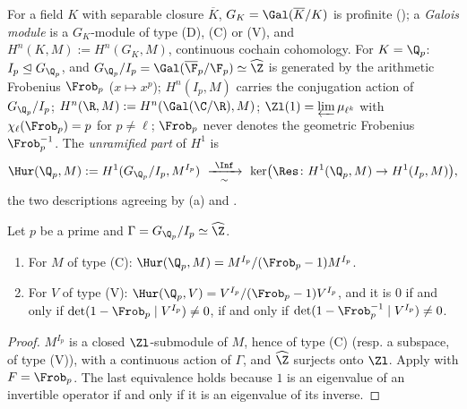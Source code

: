 \begin{convention}\label{conv:cohomology:galois}
For a field $K$ with separable closure $\overline K$, $G_K=\Gal(\overline K/K)$ is profinite (); a \emph{Galois module} is a $G_K$-module of type (D), (C) or
(V), and $H^n(K,M):=H^n(G_K,M)$, continuous cochain cohomology. For $K=\Q_p$: $I_p\trianglelefteq G_{\Q_p}$, and $G_{\Q_p}/I_p=\Gal(\overline\F_p/\F_p)\simeq\widehat\Z$ is generated by the
arithmetic Frobenius $\Frob_p$ ($x\mapsto x^p$); $H^n(I_p,M)$ carries the conjugation action of $G_{\Q_p}/I_p$; $H^n(\R,M):=H^n(\Gal(\C/\R),M)$; $\Zl(1)=\varprojlim\mu_{\ell^k}$
with $\chi_\ell(\Frob_p)=p$ for $p\ne\ell$; $\Frob_p$ never denotes the geometric Frobenius $\Frob_p^{-1}$. The \emph{unramified part} of $H^1$ is
\[
\Hur(\Q_p,M):=H^1(G_{\Q_p}/I_p,M^{I_p})\ \xrightarrow[\ \sim\ ]{\ \Inf\ }\ \ker\bigl(\Res\colon H^1(\Q_p,M)\to H^1(I_p,M)\bigr),
\]
the two descriptions agreeing by (a) and .
\end{convention}

\begin{proposition}\label{prop:cohomology:unramified}
Let $p$ be a prime and $\Gamma=G_{\Q_p}/I_p\simeq\widehat\Z$.
\begin{enumerate}[label=(\roman*)]
\item For $M$ of type (C): $\Hur(\Q_p,M)=M^{I_p}/(\Frob_p-1)M^{I_p}$.
\item For $V$ of type (V): $\Hur(\Q_p,V)=V^{I_p}/(\Frob_p-1)V^{I_p}$, and it is $0$ if and only if $\det(1-\Frob_p\mid V^{I_p})\ne0$, if and only if
$\det(1-\Frob_p^{-1}\mid V^{I_p})\ne0$.
\end{enumerate}
\end{proposition}

\begin{proof}
$M^{I_p}$ is a closed $\Zl$-submodule of $M$, hence of type (C) (resp. a subspace, of type (V)), with a continuous action of $\Gamma$, and $\widehat\Z$ surjects onto $\Zl$.
Apply  with $F=\Frob_p$. The last equivalence holds because $1$ is an eigenvalue of an invertible operator if and only if it is
an eigenvalue of its inverse.
\end{proof}

